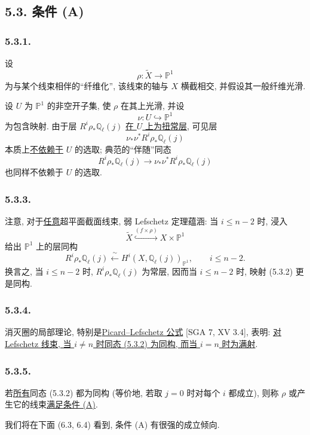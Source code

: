\subsection*{5.3. 条件 (A)}

\subsubsection*{5.3.1.}
设
\[
\rho:\widetilde X\longrightarrow\mathbb P^1
\]
为与某个线束相伴的“纤维化”, 该线束的轴与 $X$ 横截相交, 并假设其一般纤维光滑.

设 $U$ 为 $\mathbb P^1$ 的非空开子集, 使 $\rho$ 在其上光滑, 并设
\begin{equation}\tag{5.3.1.1}
\nu:U\hookrightarrow\mathbb P^1
\end{equation}
为包含映射. 由于层 $R^i\rho_*\mathbb Q_\ell(j)$ \underline{在 $U$ 上为扭常层}, 可见层
\[
\nu_*\nu^*R^i\rho_*\mathbb Q_\ell(j)
\]
本质上\underline{不依赖于} $U$ 的选取; 典范的“伴随”同态
\begin{equation}\tag{5.3.2}
R^i\rho_*\mathbb Q_\ell(j)
\longrightarrow
\nu_*\nu^*R^i\rho_*\mathbb Q_\ell(j)
\end{equation}
也同样不依赖于 $U$ 的选取.

\subsubsection*{5.3.3.}
注意, 对于\underline{任意}超平面截面线束, 弱 Lefschetz 定理蕴涵: 当 $i\leq n-2$ 时, 浸入
\[
\widetilde X\overset{(f\times\rho)}{\hookrightarrow}
X\times\mathbb P^1
\]
给出 $\mathbb P^1$ 上的层同构
\[
R^i\rho_*\mathbb Q_\ell(j)
\xleftarrow{\ \sim\ }
H^i(X,\mathbb Q_\ell(j))_{\mathbb P^1},
\qquad i\leq n-2.
\]
换言之, 当 $i\leq n-2$ 时, $R^i\rho_*\mathbb Q_\ell(j)$ 为常层, 因而当 $i\leq n-2$ 时, 映射 (5.3.2) 更是同构.

\subsubsection*{5.3.4.}
消灭圈的局部理论, 特别是\underline{Picard--Lefschetz 公式} [SGA 7, XV 3.4], 表明:
\underline{对 Lefschetz 线束, 当 $i\neq n$ 时同态 (5.3.2) 为同构, 而当 $i=n$ 时为满射}.

\subsubsection*{5.3.5.}
若\underline{所有}同态 (5.3.2) 都为同构 (等价地, 若取 $j=0$ 时对每个 $i$ 都成立), 则称 $\rho$ 或产生它的线束\underline{满足条件 (A)}.

我们将在下面 (6.3, 6.4) 看到, 条件 (A) 有很强的成立倾向.
